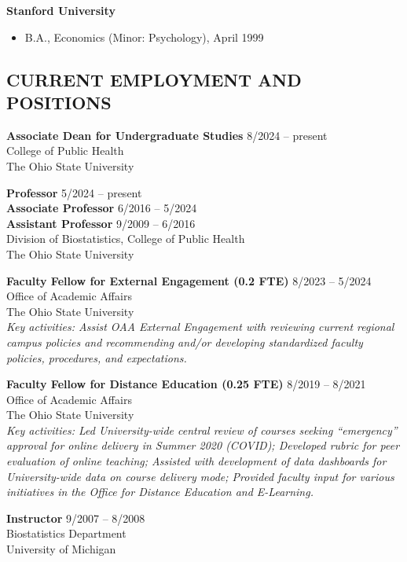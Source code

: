 \documentclass[
  english,
  letterpaper,
  DIV=11,
  numbers=noendperiod]{scrartcl}
\providecommand{\tightlist}{%
  \setlength{\itemsep}{0pt}\setlength{\parskip}{0pt}}
\begin{document}
\textbf{Stanford University}

\begin{itemize}
\tightlist
\item
  B.A., Economics (Minor: Psychology), April 1999
\end{itemize}

\subsection{CURRENT EMPLOYMENT AND
POSITIONS}\label{current-employment-and-positions}

\textbf{Associate Dean for Undergraduate Studies} {8/2024 -- present}\\
College of Public Health\\
The Ohio State University

\textbf{Professor} {5/2024 -- present}\\
\textbf{Associate Professor} {6/2016 -- 5/2024}\\
\textbf{Assistant Professor} {9/2009 -- 6/2016}\\
Division of Biostatistics, College of Public Health\\
The Ohio State University

\textbf{Faculty Fellow for External Engagement (0.2 FTE)} {8/2023 --
5/2024}\\
Office of Academic Affairs\\
The Ohio State University\\
\emph{Key activities: Assist OAA External Engagement with reviewing
current regional campus policies and recommending and/or developing
standardized faculty policies, procedures, and expectations.}

\textbf{Faculty Fellow for Distance Education (0.25 FTE)} {8/2019 --
8/2021}\\
Office of Academic Affairs\\
The Ohio State University\\
\emph{Key activities: Led University-wide central review of courses
seeking ``emergency'' approval for online delivery in Summer 2020
(COVID); Developed rubric for peer evaluation of online teaching;
Assisted with development of data dashboards for University-wide data on
course delivery mode; Provided faculty input for various initiatives in
the Office for Distance Education and E-Learning.}

\textbf{Instructor} {9/2007 -- 8/2008}\\
Biostatistics Department\\
University of Michigan
\end{document}
